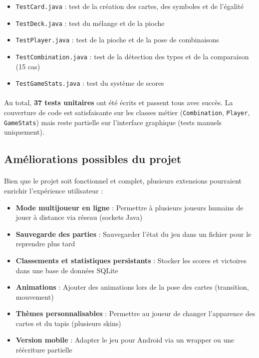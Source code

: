 \begin{itemize}
\item \texttt{TestCard.java} : test de la création des cartes, des symboles et de l'égalité
\item \texttt{TestDeck.java} : test du mélange et de la pioche
\item \texttt{TestPlayer.java} : test de la pioche et de la pose de combinaisons
\item \texttt{TestCombination.java} : test de la détection des types et de la comparaison (15 cas)
\item \texttt{TestGameStats.java} : test du système de scores
\end{itemize}

\paragraph{} Au total, \textbf{37 tests unitaires} ont été écrits et passent tous avec succès. La couverture de code est satisfaisante sur les classes métier (\texttt{Combination}, \texttt{Player}, \texttt{GameStats}) mais reste partielle sur l'interface graphique (tests manuels uniquement).

\subsection{Améliorations possibles du projet}
\paragraph{} Bien que le projet soit fonctionnel et complet, plusieurs extensions pourraient enrichir l'expérience utilisateur :

\begin{itemize}
\item \textbf{Mode multijoueur en ligne} : Permettre à plusieurs joueurs humains de jouer à distance via réseau (sockets Java)
\item \textbf{Sauvegarde des parties} : Sauvegarder l'état du jeu dans un fichier pour le reprendre plus tard
\item \textbf{Classements et statistiques persistants} : Stocker les scores et victoires dans une base de données SQLite
\item \textbf{Animations} : Ajouter des animations lors de la pose des cartes (transition, mouvement)
\item \textbf{Thèmes personnalisables} : Permettre au joueur de changer l'apparence des cartes et du tapis (plusieurs skins)
\item \textbf{Version mobile} : Adapter le jeu pour Android via un wrapper ou une réécriture partielle
\end{itemize}

